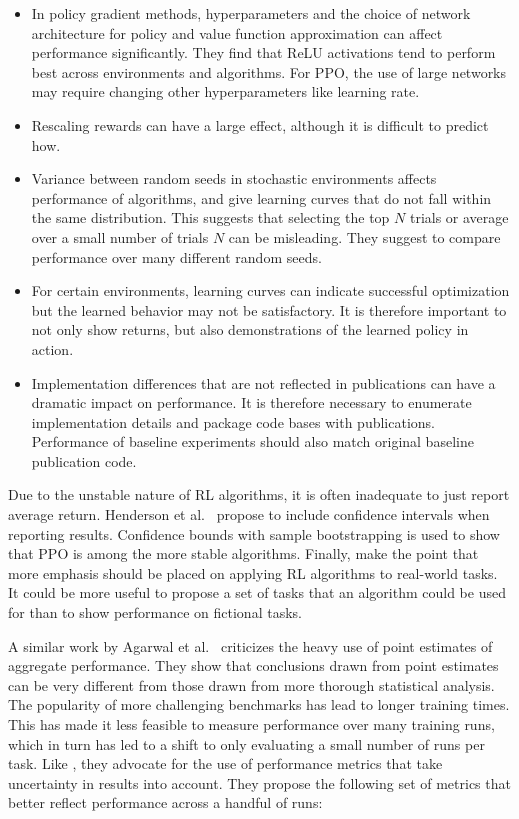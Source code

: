\begin{itemize}
    \item In policy gradient methods, hyperparameters and the choice of network architecture for policy and value function approximation can affect performance significantly.
    They find that ReLU activations tend to perform best across environments and algorithms.
    For PPO, the use of large networks may require changing other hyperparameters like learning rate.
    \item Rescaling rewards can have a large effect, although it is difficult to predict how.
    \item Variance between random seeds in stochastic environments affects performance of algorithms, and give learning curves that do not fall within the same distribution.
    This suggests that selecting the top \(N\) trials or average over a small number of trials \(N\) can be misleading. They suggest to compare performance over many different random seeds.
    \item For certain environments, learning curves can indicate successful optimization but the learned behavior may not be satisfactory.
    It is therefore important to not only show returns, but also demonstrations of the learned policy in action.
    \item Implementation differences that are not reflected in publications can have a dramatic impact on performance.
    It is therefore necessary to enumerate implementation details and package code bases with publications.
    Performance of baseline experiments should also match original baseline publication code.
\end{itemize}

Due to the unstable nature of RL algorithms, it is often inadequate to just report average return.
Henderson et al.~\cite{henderson_matters_2018} propose to include confidence intervals when reporting results.
Confidence bounds with sample bootstrapping is used to show that PPO is among the more stable algorithms.
Finally, \cite{henderson_matters_2018} make the point that more emphasis should be placed on applying RL algorithms to real-world tasks.
It could be more useful to propose a set of tasks that an algorithm could be used for than to show performance on fictional tasks.

A similar work by Agarwal et al.~\cite{agarwal_rlliable_2022} criticizes the heavy use of point estimates of aggregate performance.
They show that conclusions drawn from point estimates can be very different from those drawn from more thorough statistical analysis. 
The popularity of more challenging benchmarks has lead to longer training times.
This has made it less feasible to measure performance over many training runs,
which in turn has led to a shift to only evaluating a small number of runs per task.
Like \cite{henderson_matters_2018}, they advocate for the use  of performance metrics that take uncertainty in results into account.
They propose the following set of metrics that better reflect performance across a handful of runs:

